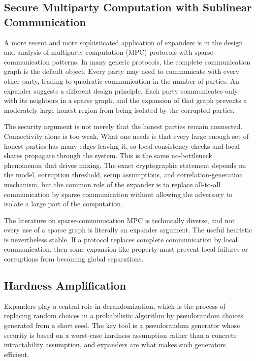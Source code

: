 \subsection{Secure Multiparty Computation with Sublinear Communication}
\label{subsec:mpc}

A more recent and more sophisticated application of expanders is in the design and analysis of multiparty computation (MPC) protocols with sparse communication patterns. In many generic protocols, the complete communication graph is the default object. Every party may need to communicate with every other party, leading to quadratic communication in the number of parties. An expander suggests a different design principle. Each party communicates only with its neighbors in a sparse graph, and the expansion of that graph prevents a moderately large honest region from being isolated by the corrupted parties.

The security argument is not merely that the honest parties remain connected. Connectivity alone is too weak. What one needs is that every large enough set of honest parties has many edges leaving it, so local consistency checks and local shares propagate through the system. This is the same no-bottleneck phenomenon that drives mixing. The exact cryptographic statement depends on the model, corruption threshold, setup assumptions, and correlation-generation mechanism, but the common role of the expander is to replace all-to-all communication by sparse communication without allowing the adversary to isolate a large part of the computation.

\begin{remark}
	The literature on sparse-communication MPC is technically diverse, and not every use of a sparse graph is literally an expander argument. The useful heuristic is nevertheless stable. If a protocol replaces complete communication by local communication, then some expansion-like property must prevent local failures or corruptions from becoming global separations.
\end{remark}

\subsection{Hardness Amplification}
\label{subsec:derandomization}

Expanders play a central role in derandomization, which is the process of replacing random choices in a probabilistic algorithm by pseudorandom choices generated from a short seed. The key tool is a pseudorandom generator whose security is based on a worst-case hardness assumption rather than a concrete intractability assumption, and expanders are what makes such generators efficient.


